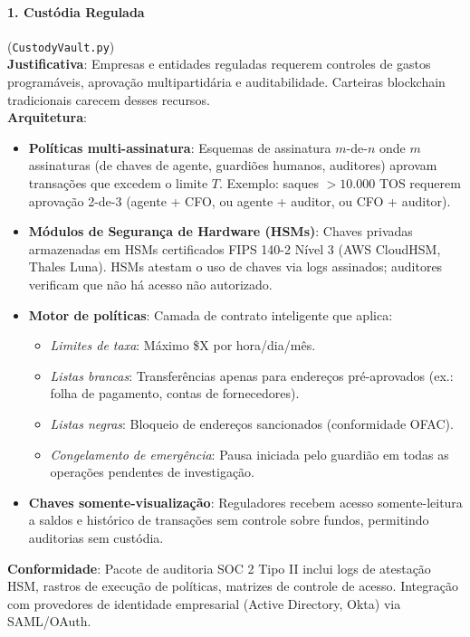 \documentclass[11pt]{article}
\begin{document}
\paragraph{1. Custódia Regulada} (\texttt{CustodyVault.py})\\
\textbf{Justificativa}: Empresas e entidades reguladas requerem controles de gastos programáveis, aprovação multipartidária e auditabilidade. Carteiras blockchain tradicionais carecem desses recursos.\\
\textbf{Arquitetura}:
\begin{itemize}[noitemsep]
  \item \textbf{Políticas multi-assinatura}: Esquemas de assinatura $m$-de-$n$ onde $m$ assinaturas (de chaves de agente, guardiões humanos, auditores) aprovam transações que excedem o limite $T$. Exemplo: saques $>10.000$ TOS requerem aprovação 2-de-3 (agente + CFO, ou agente + auditor, ou CFO + auditor).
  \item \textbf{Módulos de Segurança de Hardware (HSMs)}: Chaves privadas armazenadas em HSMs certificados FIPS 140-2 Nível 3 (AWS CloudHSM, Thales Luna). HSMs atestam o uso de chaves via logs assinados; auditores verificam que não há acesso não autorizado.
  \item \textbf{Motor de políticas}: Camada de contrato inteligente que aplica:
    \begin{itemize}[noitemsep]
      \item \emph{Limites de taxa}: Máximo \$X por hora/dia/mês.
      \item \emph{Listas brancas}: Transferências apenas para endereços pré-aprovados (ex.: folha de pagamento, contas de fornecedores).
      \item \emph{Listas negras}: Bloqueio de endereços sancionados (conformidade OFAC).
      \item \emph{Congelamento de emergência}: Pausa iniciada pelo guardião em todas as operações pendentes de investigação.
    \end{itemize}
  \item \textbf{Chaves somente-visualização}: Reguladores recebem acesso somente-leitura a saldos e histórico de transações sem controle sobre fundos, permitindo auditorias sem custódia.
\end{itemize}
\textbf{Conformidade}: Pacote de auditoria SOC 2 Tipo II inclui logs de atestação HSM, rastros de execução de políticas, matrizes de controle de acesso. Integração com provedores de identidade empresarial (Active Directory, Okta) via SAML/OAuth.
\end{document}
